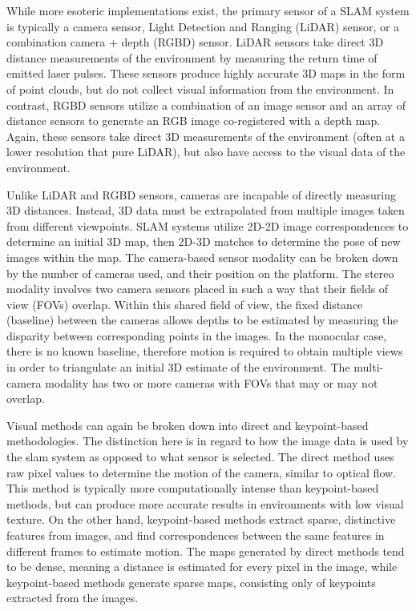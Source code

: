 While more esoteric implementations exist, the primary sensor of a SLAM system is typically a camera sensor, Light Detection and Ranging (LiDAR) sensor, or a combination camera + depth (RGBD) sensor. LiDAR sensors take direct 3D distance measurements of the environment by measuring the return time of emitted laser pulses. These sensors produce highly accurate 3D maps in the form of point clouds, but do not collect visual information from the environment. In contrast, RGBD sensors utilize a combination of an image sensor and an array of distance sensors to generate an RGB image co-registered with a depth map. Again, these sensors take direct 3D measurements of the environment (often at a lower resolution that pure LiDAR), but also have access to the visual data of the environment.

Unlike LiDAR and RGBD sensors, cameras are incapable of directly measuring 3D distances. Instead, 3D data must be extrapolated from multiple images taken from different viewpoints. SLAM systems utilize 2D-2D image correspondences to determine an initial 3D map, then 2D-3D matches to determine the pose of new images within the map. The camera-based sensor modality can be broken down by the number of cameras used, and their position on the platform. The stereo modality involves two camera sensors placed in such a way that their fields of view (FOVs) overlap. Within this shared field of view, the fixed distance (baseline) between the cameras allows depths to be estimated by measuring the disparity between corresponding points in the images. In the monocular case, there is no known baseline, therefore motion is required to obtain multiple views in order to triangulate an initial 3D estimate of the environment. The multi-camera modality has two or more cameras with FOVs that may or may not overlap.

Visual methods can again be broken down into direct and keypoint-based methodologies. The distinction here is in regard to how the image data is used by the slam system as opposed to what sensor is selected. The direct method uses raw pixel values to determine the motion of the camera, similar to optical flow. This method is typically more computationally intense than keypoint-based methods, but can produce more accurate results in environments with low visual texture. On the other hand, keypoint-based methods extract sparse, distinctive features from images, and find correspondences between the same features in different frames to estimate motion. The maps generated by direct methods tend to be dense, meaning a distance is estimated for every pixel in the image, while keypoint-based methods generate sparse maps, consisting only of keypoints extracted from the images.

